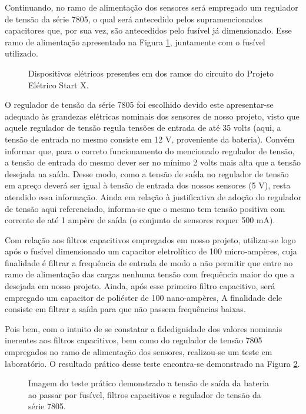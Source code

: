 Continuando, no ramo de alimentação dos sensores será empregado um regulador de tensão da série 7805, o qual será antecedido pelos supramencionados capacitores que, por sua vez, são antecedidos pelo fusível já dimensionado. Esse ramo de alimentação apresentado na Figura \ref{fonte-reguladora}, juntamente com o fusível utilizado. 

\begin{figure}[h]
	\centering
	\caption{Dispositivos elétricos presentes em dos ramos do circuito do Projeto Elétrico Start X. }
	\label{fonte-reguladora}
\end{figure}

O regulador de tensão da série 7805 foi escolhido devido este apresentar-se adequado às grandezas elétricas nominais dos sensores de nosso projeto, visto que aquele regulador de tensão regula tensões de entrada de até 35 volts (aqui, a tensão de entrada no mesmo consiste em 12 V, proveniente da bateria). Convém informar que, para o correto funcionamento do mencionado regulador de tensão, a tensão de entrada do mesmo dever ser no mínimo 2 volts mais alta que a tensão desejada na saída. Desse modo, como a tensão de saída no regulador de tensão em apreço deverá ser igual à tensão de entrada dos nossos sensores (5 V), resta atendido essa informação. Ainda em relação à justificativa de adoção do regulador de tensão aqui referenciado, informa-se que o mesmo tem tensão positiva com corrente de até 1 ampère de saída (o conjunto de sensores requer 500 mA).

Com relação aos filtros capacitivos empregados em nosso projeto, utilizar-se logo após o fusível dimensionado um capacitor eletrolítico de 100 micro-ampères, cuja finalidade é filtrar a frequência de entrada de modo a não permitir que entre no ramo de alimentação das cargas nenhuma tensão com frequência maior do que a desejada em nosso projeto. Ainda, após esse primeiro filtro capacitivo, será empregado um capacitor de poliéster de 100 nano-ampères, A finalidade dele consiste em filtrar a saída para que não passem frequências baixas.

Pois bem, com o intuito de se constatar a fidedignidade dos valores nominais inerentes aos filtros capacitivos, bem como do regulador de tensão 7805 empregados no ramo de alimentação dos sensores, realizou-se um teste em laboratório. O resultado prático desse teste encontra-se demonstrado na Figura \ref{teste-pratico}.

\begin{figure}[h]
	\centering
	\caption{Imagem do teste prático demonstrado a tensão de saída da bateria ao passar por fusível, filtros capacitivos e regulador de tensão da série 7805.}
	\label{teste-pratico}
\end{figure}

